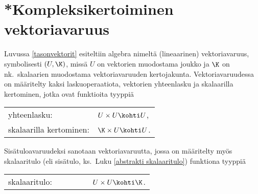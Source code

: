 \section{*Kompleksikertoiminen vektoriavaruus}
\alku
{}

Luvussa \ref{tasonvektorit} esiteltiin algebra nimeltä (lineaarinen)
vektoriavaruus, symbolisesti $(U,\K)$, missä $U$ on vektorien muodostama joukko ja $\K$ on
nk.\ skalaarien muodostama vektoriavaruuden kertojakunta. Vektoriavaruudessa on määritelty
kaksi laskuoperaatiota, vektorien yhteenlasku ja skalaarilla kertominen, jotka ovat
funktioita tyyppiä

\begin{tabular}{ll}
yhteenlasku: &$U \times U \kohti U$, \\
skalaarilla kertominen: &$\K \times U \kohti U$.
\end{tabular}

Sisätuloavaruudeksi sanotaan vektoriavaruutta, jossa on määritelty myös skalaaritulo
(eli sisätulo, ks.\ Luku \ref{abstrakti skalaaritulo}) funktiona tyyppiä

\begin{tabular}{ll}
skalaaritulo: &$\qquad\qquad\,\ U \times U \kohti \K$.
\end{tabular}


